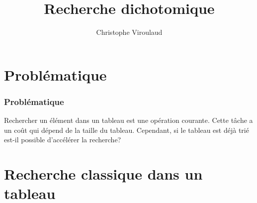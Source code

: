 \documentclass[svgnames,11pt]{beamer}
\author[]{Christophe Viroulaud}
\title{Recherche dichotomique}
\date{}
\institute{Première - NSI}
\begin{document}
\begin{frame}
\titlepage
\end{frame}

\section{Problématique}
\begin{frame}
    \frametitle{Problématique}
    Rechercher un élément dans un tableau est une opération courante. Cette tâche a un coût qui dépend de la taille du tableau.
Cependant, si le tableau est déjà trié est-il possible d'accélérer la recherche?
    \begin{center}
    \end{center}
    

\end{frame}

\section{Recherche classique dans un tableau}
\end{document}
